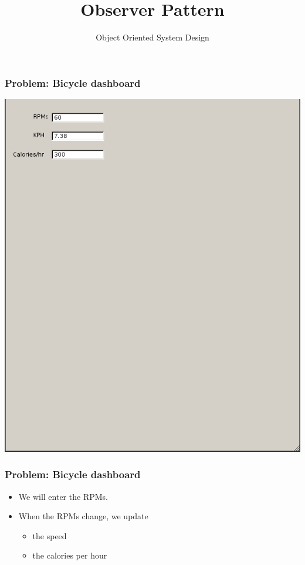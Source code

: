 \documentclass[10pt]{beamer}
\title{Observer Pattern}
\author[IN710]{Object Oriented System Design}
\institute[Otago Polytechnic]{
  Otago Polytechnic \\
  Dunedin, New Zealand \\
}
\date{}
\begin{document}
\begin{frame}[plain]
  \titlepage
\end{frame}

\begin{frame}
	\frametitle{Problem: Bicycle dashboard}

	\includegraphics[scale=.5]{ss.png}
\end{frame}

\begin{frame}
	\frametitle{Problem: Bicycle dashboard}

	\begin{itemize}
		\item We will enter the RPMs.
		\item When the RPMs change, we update
			\begin{itemize}
				\item the speed
				\item the calories per hour
			\end{itemize}
	\end{itemize}
\end{frame}
\end{document}
